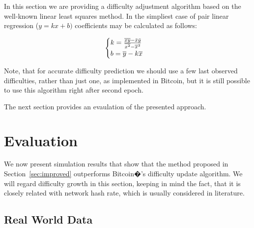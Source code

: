 \documentclass[]{llncs}
\newcommand*\mean[1]{\bar{#1}}
\newcommand*\widemean[1]{\overline{#1}}
\begin{document}
In this section we are providing a  difficulty adjustment algorithm based on the well-known linear least squares method\cite{lawson1974solving}. In the simpliest case of pair linear regression (\(y=kx+b)\) coefficients may be calculated as follows:

\begin{equation}
  \begin{cases}
    k= {{\widemean{xy} - \mean{x} \mean{y}} \over {\widemean{x^2} - \widemean{x}^2}}  \\
    b= \widemean{y}-k\widemean{x}
  \end{cases}
\end{equation}

Note, that for accurate difficulty prediction we should use a few last observed difficulties, rather than just one, as implemented in Bitcoin, but it is still possible to use this algorithm right after second epoch.



The next section provides an evaulation of the presented approach.

\section{Evaluation}
\label{sec:sim}

We now present simulation results that show that the  method proposed in Section~\ref{sec:improved} outperforms Bitcoin�'s difficulty update algorithm.
We will regard difficulty growth in this section, keeping in mind the fact, that it is closely related with network hash rate, which is usually considered in literature.

\subsection{Real World Data}
\end{document}
